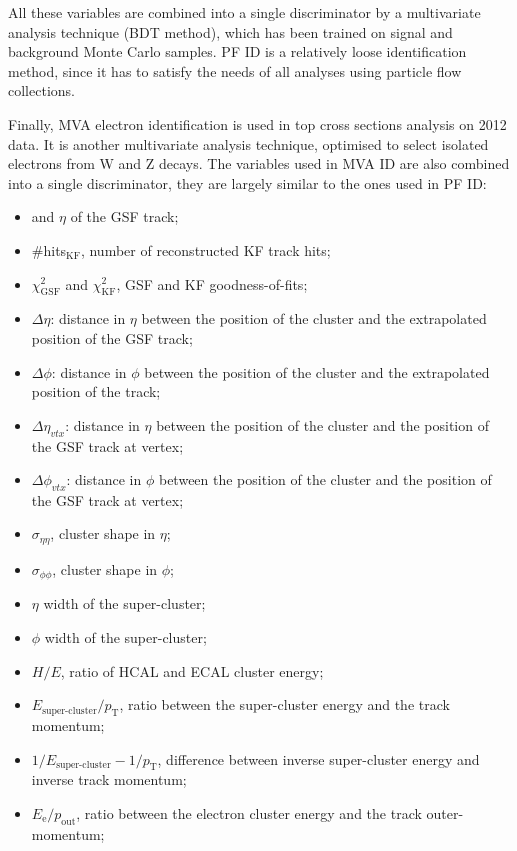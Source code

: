 All these variables are combined into a single discriminator by a multivariate analysis technique (BDT method), which
has been trained on signal and background Monte Carlo samples. PF ID is a relatively loose identification method, since
it has to satisfy the needs of all analyses using particle flow collections.

Finally, MVA electron identification is used in top cross sections analysis on 2012 data. It is another multivariate
analysis technique, optimised to select isolated electrons from W and Z decays. The variables used in MVA ID are also
combined into a single discriminator, they are largely similar to the ones used in PF ID:

\begin{itemize}
  \item \pt and $\eta$ of the GSF track;
  \item \#hits$_\text{KF}$, number of reconstructed KF track hits;
  \item $\chi^2_\textrm{GSF}$ and $\chi^2_\textrm{KF}$, GSF and KF goodness-of-fits;
  \item $\Delta\eta$: distance in $\eta$ between the position of the cluster and the extrapolated position of the
  GSF track;
  \item $\Delta\phi$: distance in $\phi$ between the position of the cluster and the extrapolated position of the
  track;
  \item $\Delta\eta_{vtx}$: distance in $\eta$ between the position of the cluster and the position of the GSF track
  at vertex;
  \item $\Delta\phi_{vtx}$: distance in $\phi$ between the position of the cluster and the position of the GSF track
  at vertex;
  \item $\sigma_{\eta \eta}$, cluster shape in $\eta$;
  \item $\sigma_{\phi \phi}$, cluster shape in $\phi$;
  \item $\eta$ width of the super-cluster;
  \item $\phi$ width of the super-cluster;
  \item $H/E$, ratio of HCAL and ECAL cluster energy;
  \item $E_\text{super-cluster}/p_\text{T}$, ratio between the super-cluster energy and the track momentum;
  \item $1/E_\text{super-cluster} - 1/p_\text{T}$, difference between inverse super-cluster energy and inverse
  track momentum;
  \item $E_\text{e}/p_\text{out}$, ratio between the electron cluster energy and the track outer-momentum;

\end{itemize}

